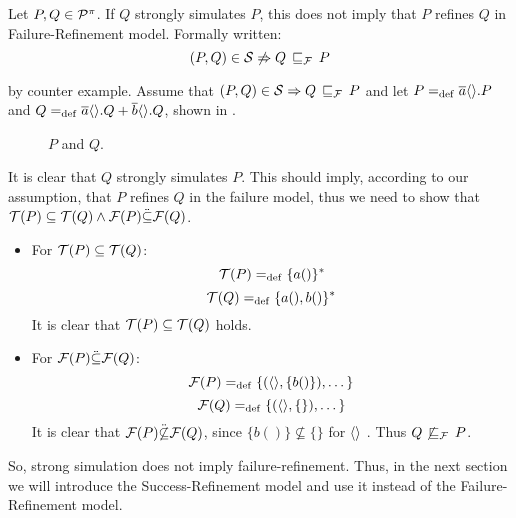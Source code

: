 \begin{rem}
\label{cor_sim_failure_refinement}
Let $P,Q\in\mathcal P^{\pi}$. If $Q$ strongly simulates $P$, this does not imply that $P$ refines $Q$ in Failure-Refinement model. Formally written:
    \[(P,Q)\in{}\simu  \not\Rightarrow Q \refiF P\]
\end{rem}%
\begin{prf}
by counter example. Assume that $(P,Q)\in{}\simu \Rightarrow Q \refiF P$ and let $P=_{\mathrm{def}}\overline{a}\langle\rangle.P$ and $Q=_{\mathrm{def}}\overline{a}\langle\rangle.Q + \overline{b}\langle\rangle.Q$, shown in .
\begin{figure}[H]%
\centering
{}%
\qquad
{}%
\caption{$P$ and $Q$.}
\label{vm_and_vmHalf}
\end{figure}

It is clear that $Q$ strongly simulates $P$. This should imply, according to our assumption, that $P$ refines $Q$ in the failure model, thus we need to show that $\Traces[P]\subseteq\Traces[Q] \wedge \Failures[P]\ddot{\subseteq}\Failures[Q]$.
\begin{itemize}
\item For $\Traces[P]\subseteq\Traces[Q]$:
    \[\Traces[P] \define \{a()\}^\ast\]
    \[\Traces[Q] \define \{a(),b()\}^\ast\]
It is clear that $\Traces[P]\subseteq\Traces[Q]$ holds. 
\item For $\Failures[P]\ddot{\subseteq}\Failures[Q]$:
    \[\Failures[P] \define \{(\out{}{},\{b()\}),\dots\}\]
    \[\Failures[Q] \define \{(\out{}{},\{\}),\dots\}\]
It is clear that $\Failures[P]\ddot{\not\subseteq}\Failures[Q]$, since $\{b()\} \not\subseteq \{\}$ for $\overline{}\langle\rangle$ . Thus $Q \not\refiF P$.
\end{itemize}
So, strong simulation does not imply failure-refinement. Thus, in the next section we will introduce the Success-Refinement model and use it instead of the Failure-Refinement model.
\end{prf}